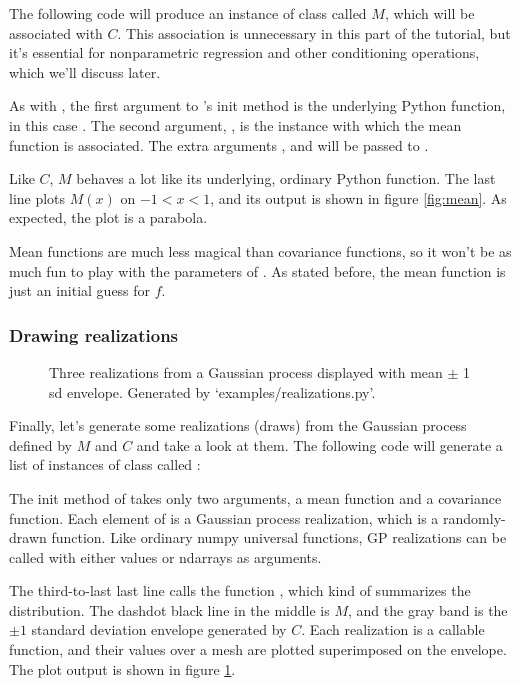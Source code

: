 \documentclass{manual}
\begin{document}
The following code will produce an instance of class  called $M$, which will be associated with $C$. This association is unnecessary in this part of the tutorial, but it's essential for nonparametric regression and other conditioning operations, which we'll discuss later.


As with , the first argument to 's init method is the underlying Python function, in this case . The second argument, , is the  instance with which the mean function is associated. The extra arguments ,   and  will be passed to .

Like $C$, $M$ behaves a lot like its underlying, ordinary Python function. The last line plots $M(x)$ on $-1<x<1$, and its output is shown in figure \ref{fig:mean}. As expected, the plot is a parabola. 

Mean functions are much less magical than covariance functions, so it won't be as much fun to play with the parameters of . As stated before, the mean function is just an initial guess for $f$.

\subsubsection{Drawing realizations}\label{subsub:realizations}
\begin{figure}
	\centering
	\caption{Three realizations from a Gaussian process displayed with mean $\pm$ 1 sd envelope. Generated by {\sffamily `examples/realizations.py'}.}
	\label{fig:realizations}
\end{figure}

Finally, let's generate some realizations (draws) from the Gaussian process defined by $M$ and $C$ and take a look at them. The following code will generate a list of instances of class  called :


The init method of  takes only two arguments, a mean function and a covariance function. Each element of  is a Gaussian process realization, which is a randomly-drawn function. Like ordinary numpy universal functions, GP realizations can be called with either values or ndarrays as arguments.

The third-to-last last line calls the function , which kind of summarizes the distribution. The dashdot black line in the middle is $M$, and the gray band is the $\pm 1$ standard deviation envelope generated by $C$. Each realization is a callable function, and their values over a mesh are plotted superimposed on the envelope. The plot output is shown in figure \ref{fig:realizations}. 
\end{document}
